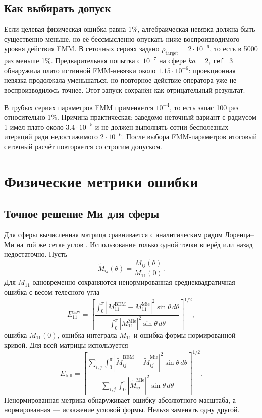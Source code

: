\documentclass[12pt,a4paper]{article}
\begin{document}
\subsection{Как выбирать допуск}

Если целевая физическая ошибка равна 1\%, алгебраическая невязка должна быть
существенно меньше, но её бессмысленно опускать ниже воспроизводимого уровня
действия FMM. В сеточных сериях задано $\rho_{\mathrm{target}}=2\cdot10^{-6}$,
то есть в 5000 раз меньше 1\%. Предварительная попытка с $10^{-7}$ на сфере
$ka=2$, \texttt{ref}=3 обнаружила плато истинной FMM-невязки около
$1.15\cdot10^{-6}$: проекционная невязка продолжала уменьшаться, но повторное
действие оператора уже не воспроизводилось точнее. Этот запуск сохранён как
отрицательный результат.

В грубых сериях параметров FMM применяется $10^{-4}$, то есть запас 100 раз
относительно 1\%. Причина практическая: заведомо неточный вариант с радиусом 1
имел плато около $3.4\cdot10^{-5}$ и не должен выполнять сотни бесполезных
итераций ради недостижимого $2\cdot10^{-6}$. После выбора FMM-параметров
итоговый сеточный расчёт повторяется со строгим допуском.

\section{Физические метрики ошибки}

\subsection{Точное решение Ми для сферы}

Для сферы вычисленная матрица сравнивается с аналитическим рядом Лоренца--Ми на
той же сетке углов \cite{wiscombe1980}. Использование только одной точки вперёд или назад
недостаточно. Пусть
\begin{equation}
  \widetilde M_{ij}(\theta)=
  \frac{M_{ij}(\theta)}{M_{11}(0)}.
\end{equation}
Для $M_{11}$ одновременно сохраняются ненормированная среднеквадратичная ошибка
с весом телесного угла
\begin{equation}
  E_{11}^{\mathrm{raw}}=
  \left[
  \frac{\int_0^\pi
  |M_{11}^{\mathrm{BEM}}-M_{11}^{\mathrm{Mie}}|^2\sin\theta\,d\theta}
  {\int_0^\pi|M_{11}^{\mathrm{Mie}}|^2\sin\theta\,d\theta}
  \right]^{1/2},
  \label{eq:m11-error}
\end{equation}
ошибка $M_{11}(0)$, ошибка интеграла $M_{11}$ и ошибка формы нормированной
кривой. Для всей матрицы используется
\begin{equation}
  E_{\mathrm{full}}=
  \left[
  \frac{\sum_{i,j}\int_0^\pi
  |\widetilde M_{ij}^{\mathrm{BEM}}-
  \widetilde M_{ij}^{\mathrm{Mie}}|^2\sin\theta\,d\theta}
  {\sum_{i,j}\int_0^\pi
  |\widetilde M_{ij}^{\mathrm{Mie}}|^2\sin\theta\,d\theta}
  \right]^{1/2}.
  \label{eq:full-error}
\end{equation}
Ненормированная метрика обнаруживает ошибку абсолютного масштаба, а
нормированная --- искажение угловой формы. Нельзя заменять одну другой.
\end{document}
